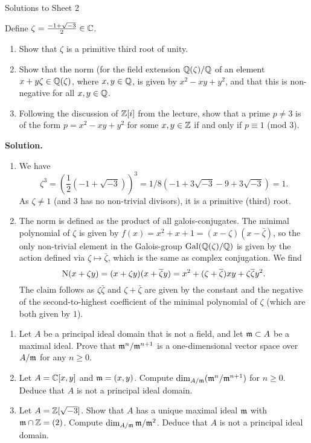 \documentclass[a4paper,11pt]{article}
\begin{document}
\begin{center}
    \huge{Solutions to Sheet 2}
\end{center}

Define $\zeta = \frac{-1 + \sqrt{-3}}2 \in \mathbb{C}$. 
\begin{enumerate}
    \item Show that $\zeta$ is a primitive third root of unity.
    \item Show that the norm (for the field extension $\mathbb{Q}(\zeta)/\mathbb{Q}$ of
        an element $x + y\zeta \in \mathbb{Q}(\zeta)$, where $x,y \in \mathbb{Q}$, is given by
        $x^2 - xy + y^2$, and that this is non-negative for all $x,y \in \mathbb{Q}$. 
    \item  Following the discussion of $\mathbb{Z}[i]$ from the lecture, show that a prime
        $p \neq 3$ is of the form $p = x^2 - xy + y^2$ for some $x,y \in \mathbb{Z}$ if
        and only if $p \equiv 1$ (mod $3$). 
\end{enumerate}

\textbf{Solution.}
\begin{enumerate}
    \item We have 
        $$\zeta^3 = \left(\frac 12 (-1 + \sqrt{-3})\right)^3 = 1/8(-1 +
        3\sqrt{-3} - 9 + 3 \sqrt{-3}) = 1.$$ 
        As $\zeta \neq 1$ (and $3$ has no non-trivial
        divisors), it is a primitive (third) root. 
    \item The norm is defined as the product of all galois-conjugates. The minimal
        polynomial of $\zeta$ is given by $f(x) = x^2 + x + 1 = (x - \zeta)(x -
        \bar \zeta)$, so the only non-trivial element in the Galois-group
        $\operatorname{Gal}(\mathbb{Q}(\zeta)/\mathbb{Q})$ is given by the action defined via 
        $\zeta \mapsto \bar \zeta$, which is the same as complex conjugation. 
        We find 
        $$\operatorname{N}(x+\zeta y) = (x+\zeta y)(x + \overline \zeta y) = x^2 + (\zeta +
        \overline \zeta)xy + \zeta \overline \zeta y^2.$$
        The claim follows as $\zeta \bar \zeta$ and $\zeta + \bar \zeta$
        are given by the constant and the negative of the second-to-highest
        coefficient of the minimal polynomial of $\zeta$ (which are both given by
        $1$).


\end{enumerate}

\begin{enumerate}
    \item Let $A$ be a principal ideal domain that is not a field, and let $\mathfrak{m}
        \subset A$ be a maximal ideal. Prove that $\mathfrak{m}^n/\mathfrak{m}^{n+1}$ is a
        one-dimensional vector space over $A/\mathfrak{m}$ for any $n \geq 0$. 
    \item Let $A = \mathbb{C}[x,y]$ and $\mathfrak{m} = (x,y)$. Compute $\dim_{A/\mathfrak{m}} (\mathfrak{m}^n
        /\mathfrak{m}^{n+1})$ for $n \geq 0$. Deduce that $A$ is not a principal ideal
        domain. 
    \item Let $A = \mathbb{Z}[\sqrt{-3}]$. Show that $A$ has a unique maximal ideal $\mathfrak{m}$
        with $\mathfrak{m} \cap \mathbb{Z} = (2)$. Compute $\dim_{A/\mathfrak{m}} \mathfrak{m}/\mathfrak{m}^2$. Deduce that 
        $A$ is not a principal ideal domain.
\end{enumerate}
\end{document}
